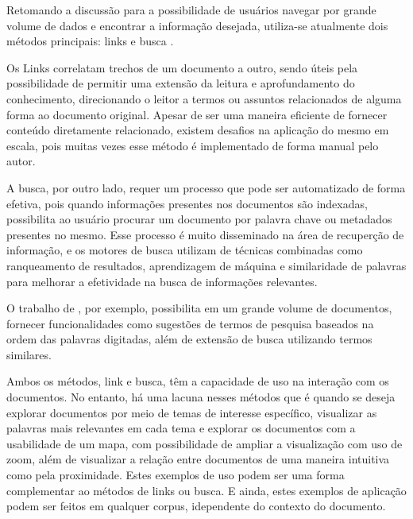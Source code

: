 \documentclass[12pt,a4paper]{article}
\begin{document}
 
 Retomando a discussão para a possibilidade de usuários navegar por grande volume de dados e encontrar a informação desejada, utiliza-se atualmente dois métodos principais:
 links e busca  \cite{blei2012probabilistic}. 
 
 Os Links correlatam trechos de um documento a outro, sendo úteis pela possibilidade de permitir uma extensão da leitura e aprofundamento do conhecimento,
 direcionando o leitor a termos ou assuntos relacionados de alguma forma ao documento original. Apesar de ser uma maneira eficiente de fornecer conteúdo diretamente relacionado,
 existem desafios na aplicação do mesmo em escala, pois muitas vezes esse método é implementado de forma manual pelo autor. 
 
 A busca, por outro lado,
 requer um processo que pode ser automatizado de forma efetiva, pois quando informações presentes nos documentos são indexadas, possibilita ao usuário procurar um documento por palavra chave ou metadados presentes no mesmo.
 Esse processo é muito disseminado na área de recuperção de informação, e os motores de busca utilizam de técnicas combinadas como ranqueamento de resultados, aprendizagem de máquina e similaridade de palavras para melhorar a efetividade na busca de informações relevantes.

 O trabalho de , por exemplo, possibilita em um grande volume de documentos, fornecer funcionalidades como sugestões de termos de pesquisa baseados na ordem das palavras digitadas, além de extensão de busca utilizando termos similares.

Ambos os métodos, link e busca, têm a capacidade de uso na interação com os documentos. No entanto, há uma lacuna nesses métodos que é quando se deseja explorar documentos por meio de temas de interesse específico,
 visualizar as palavras mais relevantes em cada tema e explorar os documentos com a usabilidade de um mapa, com possibilidade de ampliar a visualização com uso de zoom, além de visualizar a relação entre documentos de uma maneira intuitiva como pela proximidade. Estes exemplos de uso podem ser uma forma complementar ao métodos de links ou busca. E ainda, estes exemplos de aplicação podem ser feitos em qualquer corpus, idependente do contexto do documento.
 
\end{document}
